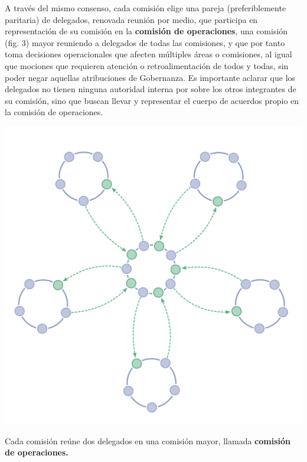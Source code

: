 \documentclass[justified]{tufte-handout} %
\begin{document}
A través del mismo consenso, cada comisión elige una pareja (preferiblemente paritaria) de delegados, renovada reunión por medio, que participa en representación de su comisión en la \textbf{comisión de operaciones}, una comisión (fig. 3) mayor reuniendo a delegados de todas las comisiones, y que por tanto toma decisiones operacionales que afecten múltiples áreas o comisiones, al igual que mociones que requieren atención o retroalimentación de todos y todas, sin poder negar aquellas atribuciones de Gobernanza. Es importante aclarar que los delegados no tienen ninguna autoridad interna por sobre los otros integrantes de su comisión, sino que buscan llevar y representar el cuerpo de acuerdos propio en la comisión de operaciones.

\begin{marginfigure}[-200px]
	\includegraphics[width=\linewidth]{jerarquia.png}
	\caption{Cada comisión reúne dos delegados en una comisión mayor, llamada \textbf{comisión de operaciones.}}
	\label{fig:jerarquia}
\end{marginfigure}





\end{document}
